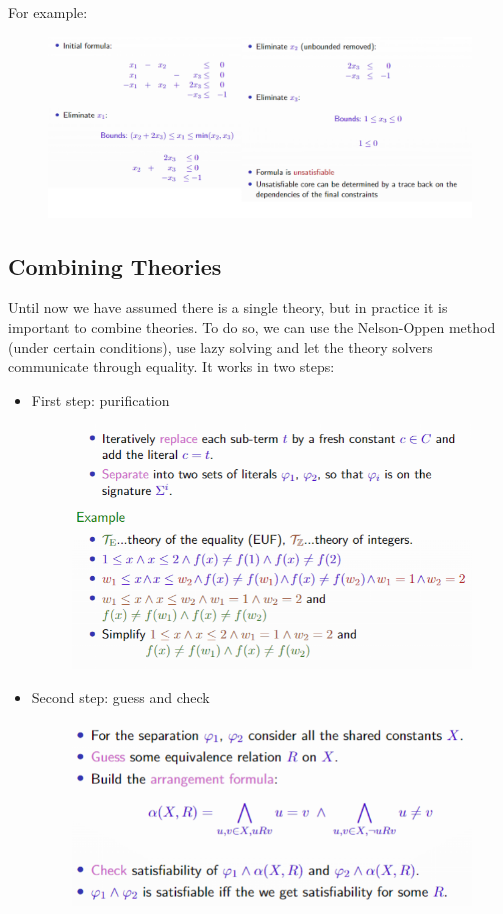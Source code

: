 \documentclass[10pt,a4paper]{report}
\begin{document}
For example:
\begin{figure}[H]
    \centering
    \includegraphics[scale=0.5]{39.png}
\end{figure}
\subsection{Combining Theories}
Until now we have assumed there is a single theory, but in practice it is important to combine theories. To do so, we can use the Nelson-Oppen method (under certain conditions), use lazy solving and let the theory solvers communicate through equality. It works in two steps:
\begin{itemize}
    \item First step: puriﬁcation
    \begin{figure}[H]
        \centering
        \includegraphics[scale=0.5]{40.png}
    \end{figure}
    \item Second step: guess and check
    \begin{figure}[H]
        \centering
        \includegraphics[scale=0.5]{41.png}
    \end{figure}
\end{itemize}
\end{document}
